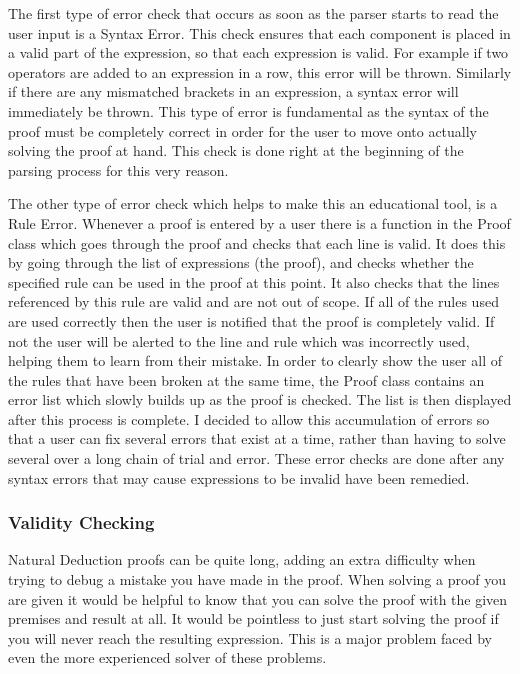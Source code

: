 The first type of error check that occurs as soon as the parser starts to read the user input is a Syntax Error. This check ensures that each component is placed in a valid part of the expression, so that each expression is valid. For example if two operators are added to an expression in a row, this error will be thrown. Similarly if there are any mismatched brackets in an expression, a syntax error will immediately be thrown. This type of error is fundamental as the syntax of the proof must be completely correct in order for the user to move onto actually solving the proof at hand. This check is done right at the beginning of the parsing process for this very reason.

The other type of error check which helps to make this an educational tool, is a Rule Error. Whenever a proof is entered by a user there is a function in the Proof class which goes through the proof and checks that each line is valid. It does this by going through the list of expressions (the proof), and checks whether the specified rule can be used in the proof at this point. It also checks that the lines referenced by this rule are valid and are not out of scope. If all of the rules used are used correctly then the user is notified that the proof is completely valid. If not the user will be alerted to the line and rule which was incorrectly used, helping them to learn from their mistake. In order to clearly show the user all of the rules that have been broken at the same time, the Proof class contains an error list which slowly builds up as the proof is checked. The list is then displayed after this process is complete. I decided to allow this accumulation of errors so that a user can fix several errors that exist at a time, rather than having to solve several over a long chain of trial and error. These error checks are done after any syntax errors that may cause expressions to be invalid have been remedied.

\subsubsection{Validity Checking}
Natural Deduction proofs can be quite long, adding an extra difficulty when trying to debug a mistake you have made in the proof. When solving a proof you are given it would be helpful to know that you can solve the proof with the given premises and result at all. It would be pointless to just start solving the proof if you will never reach the resulting expression. This is a major problem faced by even the more experienced solver of these problems.


